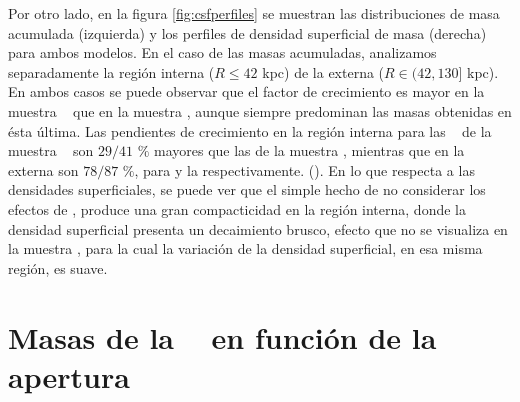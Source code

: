 Por otro lado, en la figura \ref{fig:csfperfiles} se muestran las distribuciones
de masa acumulada (izquierda) 
y los perfiles de densidad superficial de masa (derecha) para ambos modelos.
En el caso de las masas acumuladas, analizamos separadamente la regi\'on interna ($R\le 42$ kpc)
de la externa ($R\in(42,130]$ kpc). En ambos casos se puede observar que el factor de crecimiento
es mayor en la muestra  \agnon~ que en la muestra \agnoff, aunque siempre predominan
las masas obtenidas en \'esta \'ultima. Las pendientes de crecimiento en la regi\'on interna para
las \bcgs~ de la muestra \agnon~
son $29/41$ $\%$ mayores que las de la muestra \agnoff,
mientras que en la externa son $78/87$ $\%$,
para  y la  respectivamente.
(). En lo que respecta a las densidades superficiales, 
se puede ver que el simple hecho de no considerar los efectos de \agn, produce una
gran compacticidad en la regi\'on interna, donde 
la densidad superficial presenta un decaimiento brusco, efecto que no se visualiza en la muestra
\agnoff, para la cual la variaci\'on de la densidad superficial, en esa misma regi\'on, es
suave.




\section{Masas de la \bcg~ en funci\'on de la apertura}
\label{sec:aperturas}

